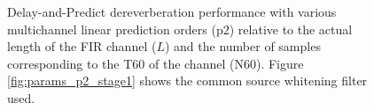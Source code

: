 \begin{figure}[H]
	\label{subfig:params_p2_compare:C}
	
	\vspace{1em}
	
	\label{subfig:params_p2_compare:D}
	
	\caption{Delay-and-Predict dereverberation performance with various multichannel linear prediction orders ($\mathrm{p2}$) relative to the actual length of the FIR channel ($L$) and the number of samples corresponding to the T60 of the channel ($\mathrm{N60}$). Figure \ref{fig:params_p2_stage1} shows the common source whitening filter used.}
\label{fig:params_p2_compare}
	
\end{figure}

